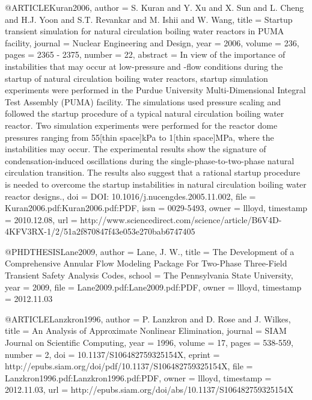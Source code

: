 {@ARTICLE{Kuran2006,
  author = {S. Kuran and Y. Xu and X. Sun and L. Cheng and H.J. Yoon and S.T.
	Revankar and M. Ishii and W. Wang},
  title = {Startup transient simulation for natural circulation boiling water
	reactors in PUMA facility},
  journal = {Nuclear Engineering and Design},
  year = {2006},
  volume = {236},
  pages = {2365 - 2375},
  number = {22},
  abstract = {In view of the importance of instabilities that may occur at low-pressure
	and -flow conditions during the startup of natural circulation boiling
	water reactors, startup simulation experiments were performed in
	the Purdue University Multi-Dimensional Integral Test Assembly (PUMA)
	facility. The simulations used pressure scaling and followed the
	startup procedure of a typical natural circulation boiling water
	reactor. Two simulation experiments were performed for the reactor
	dome pressures ranging from 55[thin space]kPa to 1[thin space]MPa,
	where the instabilities may occur. The experimental results show
	the signature of condensation-induced oscillations during the single-phase-to-two-phase
	natural circulation transition. The results also suggest that a rational
	startup procedure is needed to overcome the startup instabilities
	in natural circulation boiling water reactor designs.},
  doi = {DOI: 10.1016/j.nucengdes.2005.11.002},
  file = {Kuran2006.pdf:Kuran2006.pdf:PDF},
  issn = {0029-5493},
  owner = {llloyd},
  timestamp = {2010.12.08},
  url = {http://www.sciencedirect.com/science/article/B6V4D-4KFV3RX-1/2/51a2f870847f43e053e270bab6747405}
}

@PHDTHESIS{Lane2009,
  author = {Lane, J. W.},
  title = {The Development of a Comprehensive Annular Flow Modeling Package
	For Two-Phase Three-Field Transient Safety Analysis Codes},
  school = {The Pennsylvania State University},
  year = {2009},
  file = {Lane2009.pdf:Lane2009.pdf:PDF},
  owner = {llloyd},
  timestamp = {2012.11.03}
}

@ARTICLE{Lanzkron1996,
  author = {P. Lanzkron and D. Rose and J. Wilkes},
  title = {An Analysis of Approximate Nonlinear Elimination},
  journal = {SIAM Journal on Scientific Computing},
  year = {1996},
  volume = {17},
  pages = {538-559},
  number = {2},
  doi = {10.1137/S106482759325154X},
  eprint = {http://epubs.siam.org/doi/pdf/10.1137/S106482759325154X},
  file = {Lanzkron1996.pdf:Lanzkron1996.pdf:PDF},
  owner = {llloyd},
  timestamp = {2012.11.03},
  url = {http://epubs.siam.org/doi/abs/10.1137/S106482759325154X}
}

}

